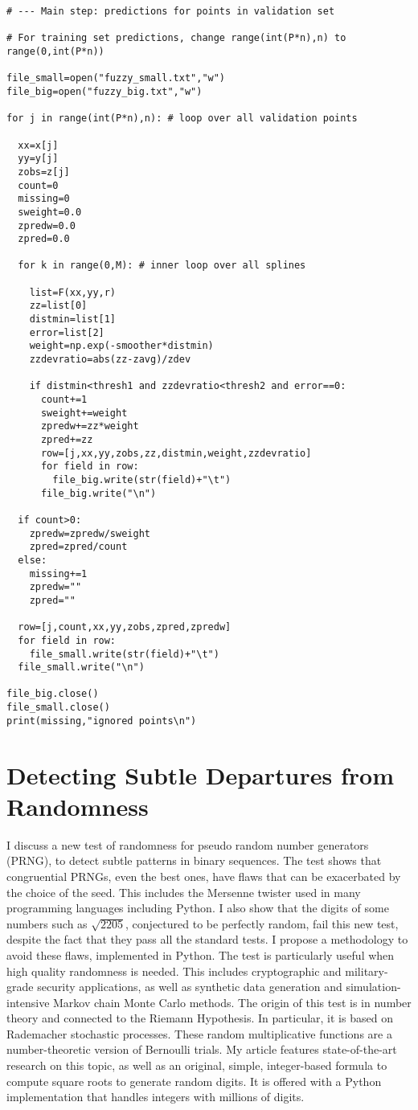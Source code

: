 \documentclass[oneside,10pt]{book}
\newcommand\Chapter[2]{
  \chapter[#1]{#1\\[2ex]\Large\itshape#2}
}
\begin{document}
\begin{lstlisting}
# --- Main step: predictions for points in validation set

# For training set predictions, change range(int(P*n),n) to range(0,int(P*n))

file_small=open("fuzzy_small.txt","w")
file_big=open("fuzzy_big.txt","w")

for j in range(int(P*n),n): # loop over all validation points 

  xx=x[j]
  yy=y[j]
  zobs=z[j]
  count=0
  missing=0
  sweight=0.0
  zpredw=0.0
  zpred=0.0

  for k in range(0,M): # inner loop over all splines

    list=F(xx,yy,r)
    zz=list[0]
    distmin=list[1]
    error=list[2]
    weight=np.exp(-smoother*distmin)  
    zzdevratio=abs(zz-zavg)/zdev

    if distmin<thresh1 and zzdevratio<thresh2 and error==0: 
      count+=1
      sweight+=weight
      zpredw+=zz*weight
      zpred+=zz
      row=[j,xx,yy,zobs,zz,distmin,weight,zzdevratio]
      for field in row:
        file_big.write(str(field)+"\t")
      file_big.write("\n")

  if count>0:
    zpredw=zpredw/sweight
    zpred=zpred/count
  else:
    missing+=1
    zpredw=""
    zpred=""

  row=[j,count,xx,yy,zobs,zpred,zpredw] 
  for field in row:
    file_small.write(str(field)+"\t")
  file_small.write("\n")

file_big.close()
file_small.close()
print(missing,"ignored points\n")
\end{lstlisting}

\Chapter{Detecting Subtle Departures from Randomness}{}\label{chapterPRNG}

I discuss a new test of randomness for pseudo random number generators (PRNG), to detect subtle patterns in binary sequences. The test shows that congruential PRNGs, even the best ones, have flaws that can be exacerbated by the choice of the seed. This includes the Mersenne twister used in many programming languages including Python. I also show that the digits of some numbers such as $\sqrt{2205}$, conjectured to be
perfectly random, fail this new test, despite the fact that they pass all the standard tests. I propose a methodology to avoid these flaws, implemented in Python. The test is particularly useful when high quality randomness is needed. This includes cryptographic and military-grade security applications, as well as
synthetic data generation and simulation-intensive \textcolor{index}{Markov chain Monte Carlo} methods.  The origin of this test is in number theory and connected to the Riemann 
Hypothesis. In particular, it is based on Rademacher stochastic processes. These random multiplicative functions are a number-theoretic version of Bernoulli trials.  My article features state-of-the-art research on this topic, as well as an original, simple, integer-based formula to compute square roots to generate random digits. It is offered with a Python implementation that handles integers with millions of digits. 
\end{document}
